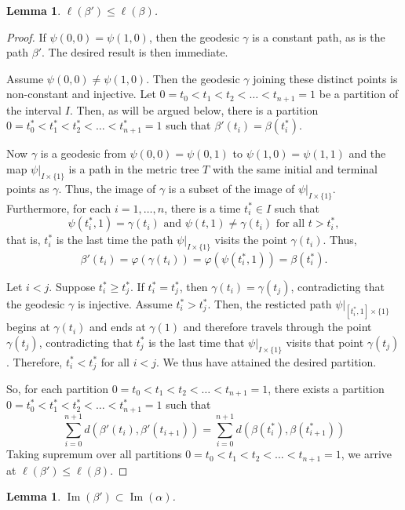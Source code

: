 \documentclass{article}
\newtheorem{lemma}[theorem]{Lemma}
\theoremstyle{definition}
\theoremstyle{remark}
\DeclareMathOperator{\Ima}{Im}
\newcommand{\length}[1]{\ell}%
\begin{document}
\begin{lemma}\label{length of beta prime}
$\length{M}(\beta')\leq\length{M}(\beta)$.
\end{lemma}

\begin{proof}
If $\psi(0,0)=\psi(1,0)$, then the geodesic $\gamma$ is a constant path, as is the path $\beta'$. The desired result is then immediate.

Assume $\psi(0,0)\neq\psi(1,0)$. Then the geodesic $\gamma$ joining these distinct points is non-constant and injective. Let $0=t_0<t_1<t_2<\ldots<t_{n+1}=1$ be a partition of the interval $I$. Then, as will be argued below, there is a partition $0=t_0^*<t_1^*<t_2^*<\ldots<t_{n+1}^*=1$ such that $\beta'(t_i)=\beta(t_i^*)$. 

Now $\gamma$ is a geodesic from $\psi(0,0)=\psi(0,1)$ to $\psi(1,0)=\psi(1,1)$ and the map $\psi|_{I\times\{1\}}$ is a path in the metric tree $T$ with the same initial and terminal points as $\gamma$. Thus, the image of $\gamma$ is a subset of the image of $\psi|_{I\times\{1\}}$. Furthermore, for each $i=1,\ldots,n$, there is a time $t_i^*\in I$ such that
\[
\psi(t_i^*,1)=\gamma(t_i)\text{ and }\psi(t,1)\neq\gamma(t_i)\text{ for all }t>t_i^*,
\]
that is, $t_i^*$ is the last time the path $\psi|_{I\times\{1\}}$ visits the point $\gamma(t_i)$. Thus,
\[
\beta'(t_i)=\varphi(\gamma(t_i))=\varphi(\psi(t_i^*,1))=\beta(t_i^*).
\]

Let $i<j$. Suppose $t_i^*\geq t_j^*$. If $t_i^*=t_j^*$, then $\gamma(t_i)=\gamma(t_j)$, contradicting that the geodesic $\gamma$ is injective. Assume $t_i^*>t_j^*$. Then, the resticted path $\psi|_{[t_i^*,1]\times\{1\}}$ begins at $\gamma(t_i)$ and ends at $\gamma(1)$ and therefore travels through the point $\gamma(t_j)$, contradicting that $t_j^*$ is the last time that $\psi|_{I\times\{1\}}$ visits that point $\gamma(t_j)$. Therefore, $t_i^*<t_j^*$ for all $i<j$. We thus have attained the desired partition. 

So, for each partition $0=t_0<t_1<t_2<\ldots<t_{n+1}=1$, there exists a partition $0=t_0^*<t_1^*<t_2^*<\ldots<t_{n+1}^*=1$ such that
\[
\sum_{i=0}^{n+1}d\left(\beta'(t_i),\beta'(t_{i+1})\right)=\sum_{i=0}^{n+1}d\left(\beta(t_i^*),\beta(t_{i+1}^*)\right)
\] 
Taking supremum over all  partitions $0=t_0<t_1<t_2<\ldots<t_{n+1}=1$, we arrive at $\length{M}(\beta')\leq\length{M}(\beta)$.
\end{proof}

\begin{lemma}\label{new path has image in initial path} %
$\Ima(\beta')\subset\Ima(\alpha)$.
\end{lemma}
\end{document}
